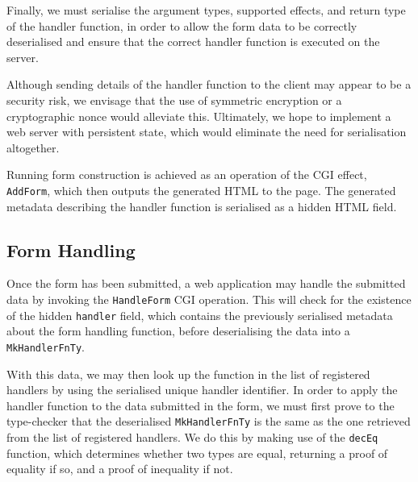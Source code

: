 \documentclass[preprint]{sigplanconf}
\begin{document}
Finally, we must serialise the argument types, supported effects, and return type of the handler function, in order to allow the form data to be correctly deserialised and ensure that the correct handler function is executed on the server. 

Although sending details of the handler function to the client may appear to be a security risk, we envisage that the use of symmetric encryption or a cryptographic nonce would alleviate this. Ultimately, we hope to implement a web server with persistent state, which would eliminate the need for serialisation altogether.

Running form construction is achieved as an operation of the CGI
effect, \texttt{AddForm}, which then outputs the generated HTML to the page.
The generated metadata describing the handler function is serialised as a
hidden HTML field.

\subsection{Form Handling}
\label{formhandling}
Once the form has been submitted, a web application may handle the submitted data by invoking the \texttt{HandleForm} CGI operation. This will check for the existence of the hidden \texttt{handler} field, which contains the previously serialised metadata about the form handling function, before deserialising the data into a \texttt{MkHandlerFnTy}. 

With this data, we may then look up the function in the list of registered handlers by using the serialised unique handler identifier. In order to apply the handler function to the data submitted in the form, we must first prove to the type-checker that the deserialised \texttt{MkHandlerFnTy} is the same as the one retrieved from the list of registered handlers. We do this by making use of the \texttt{decEq} function, which determines whether two types are equal, returning a proof of equality if so, and a proof of inequality if not.
\end{document}
